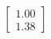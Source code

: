 \documentclass[preview]{standalone}
\begin{document}
\begin{align*}
\begin{bmatrix} 1.00 \\ 1.38 \end{bmatrix}
\end{align*}
\end{document}
